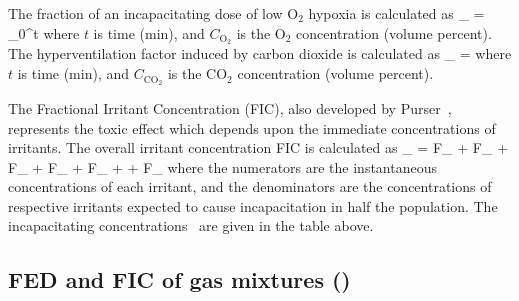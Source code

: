 \documentclass[11pt]{book}
\begin{document}
The fraction of an incapacitating dose of low O${}_2$ hypoxia is calculated as
\be
{}_ =  \int_0^t 
\ee
where $t$ is time (min), and $C_\mathrm{O_2}$ is the O${}_2$ concentration (volume percent).
The hyperventilation factor induced by carbon dioxide is calculated as
\be
{}_ =  \label{co2hyp2}
\ee
where $t$ is time (min), and $C_\mathrm{CO_2}$ is the CO${}_2$ concentration (volume percent).

The Fractional Irritant Concentration (FIC), also developed by Purser~\cite{SFPE:Purser}, represents the toxic effect which
depends upon the immediate concentrations of irritants. The overall irritant concentration FIC is calculated as
\be
{}_ =
        {F_} +
        {F_} +
         {F_} +
       {F_} +
       {F_} +
     +
      {F_}
\ee
where the numerators are the instantaneous concentrations of each irritant, and the denominators are the concentrations of respective irritants
expected to cause incapacitation in half the population. The incapacitating concentrations~\cite{SFPE:Purser} are given in the table above.

\subsection{FED and FIC of gas mixtures (\texorpdfstring{}{FED\_FIC}) }
\label{FED_FIC}
\label{FED_FIC_SMIX}
\end{document}
